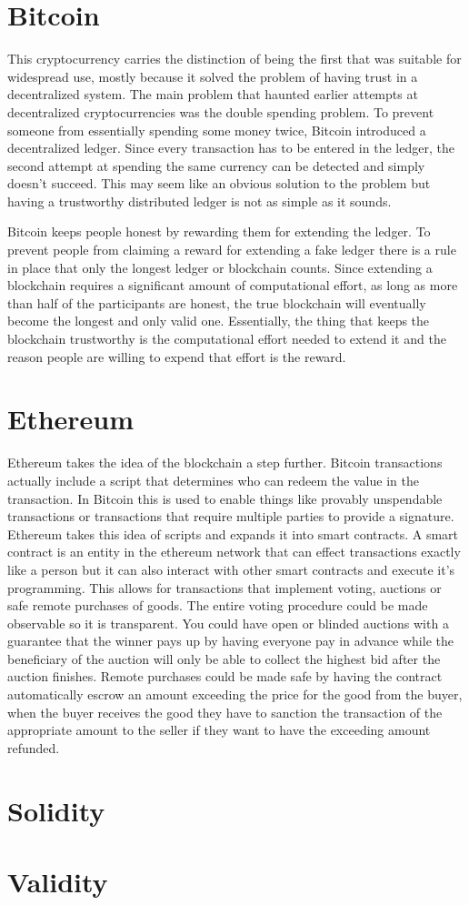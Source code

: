 \section{Bitcoin}

This cryptocurrency carries the distinction of being the first that was
suitable for widespread use, mostly because it solved the problem of having
trust in a decentralized system.
The main problem that haunted earlier attempts at decentralized
cryptocurrencies was the double spending problem.
To prevent someone from essentially spending some money twice, Bitcoin
introduced a decentralized ledger.
Since every transaction has to be entered in the ledger, the second attempt at
spending the same currency can be detected and simply doesn't succeed.
This may seem like an obvious solution to the problem but having a trustworthy
distributed ledger is not as simple as it sounds.

Bitcoin keeps people honest by rewarding them for extending the ledger.
To prevent people from claiming a reward for extending a fake ledger there is a
rule in place that only the longest ledger or blockchain counts.
Since extending a blockchain requires a significant amount of computational
effort, as long as more than half of the participants are honest, the true
blockchain will eventually become the longest and only valid one.
Essentially, the thing that keeps the blockchain trustworthy is the
computational effort needed to extend it and the reason people are willing to
expend that effort is the reward.

\section{Ethereum}

Ethereum takes the idea of the blockchain a step further.
Bitcoin transactions actually include a script that determines who can redeem
the value in the transaction.
In Bitcoin this is used to enable things like provably unspendable transactions
or transactions that require multiple parties to provide a signature.
Ethereum takes this idea of scripts and expands it into smart contracts.
A smart contract is an entity in the ethereum network that can effect
transactions exactly like a person but it can also interact with other smart
contracts and execute it's programming.
This allows for transactions that implement voting, auctions or safe remote
purchases of goods.
The entire voting procedure could be made observable so it is transparent.
You could have open or blinded auctions with a guarantee that the winner pays
up by having everyone pay in advance while the beneficiary of the auction will
only be able to collect the highest bid after the auction finishes.
Remote purchases could be made safe by having the contract automatically escrow
an amount exceeding the price for the good from the buyer, when the buyer
receives the good they have to sanction the transaction of the appropriate
amount to the seller if they want to have the exceeding amount refunded.

\section{Solidity}

\section{Validity}
